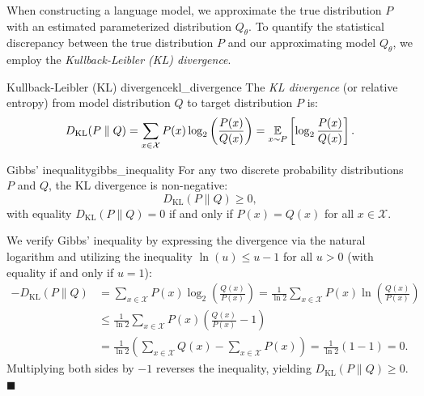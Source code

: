\documentclass[../../main.tex]{subfiles}
\begin{document}
When constructing a language model, we approximate the true distribution $P$ with an estimated parameterized distribution $Q_\theta$. To quantify the statistical discrepancy between the true distribution $P$ and our approximating model $Q_\theta$, we employ the \emph{Kullback-Leibler (KL) divergence}.

\begin{definition}{Kullback-Leibler (KL) divergence}{kl_divergence}
The \emph{KL divergence} (or relative entropy) from model distribution $Q$ to target distribution $P$ is:
\begin{equation}
\label{eq:kl_divergence}
D_{\text{KL}}(P \parallel Q) = \sum_{x \in \mathcal{X}} P(x) \log_2 \left( \frac{P(x)}{Q(x)} \right) = \operatorname*{\mathbb{E}}_{x \sim P}\left[ \log_2 \frac{P(x)}{Q(x)} \right].
\end{equation}
\end{definition}

\begin{theorem}{Gibbs' inequality}{gibbs_inequality}
For any two discrete probability distributions $P$ and $Q$, the KL divergence is non-negative:
\begin{equation}
\label{eq:gibbs_ineq}
D_{\text{KL}}(P \parallel Q) \ge 0,
\end{equation}
with equality $D_{\text{KL}}(P \parallel Q) = 0$ if and only if $P(x) = Q(x)$ for all $x \in \mathcal{X}$.
\end{theorem}

We verify Gibbs' inequality by expressing the divergence via the natural logarithm and utilizing the inequality $\ln(u) \le u - 1$ for all $u > 0$ (with equality if and only if $u = 1$):
\begin{align*}
- D_{\text{KL}}(P \parallel Q) &= \sum_{x \in \mathcal{X}} P(x) \log_2 \left( \frac{Q(x)}{P(x)} \right) = \frac{1}{\ln 2} \sum_{x \in \mathcal{X}} P(x) \ln \left( \frac{Q(x)}{P(x)} \right) \\
&\le \frac{1}{\ln 2} \sum_{x \in \mathcal{X}} P(x) \left( \frac{Q(x)}{P(x)} - 1 \right) \\
&= \frac{1}{\ln 2} \left( \sum_{x \in \mathcal{X}} Q(x) - \sum_{x \in \mathcal{X}} P(x) \right) = \frac{1}{\ln 2} (1 - 1) = 0.
\end{align*}
Multiplying both sides by $-1$ reverses the inequality, yielding $D_{\text{KL}}(P \parallel Q) \ge 0$. \hfill $\blacksquare$
\end{document}
